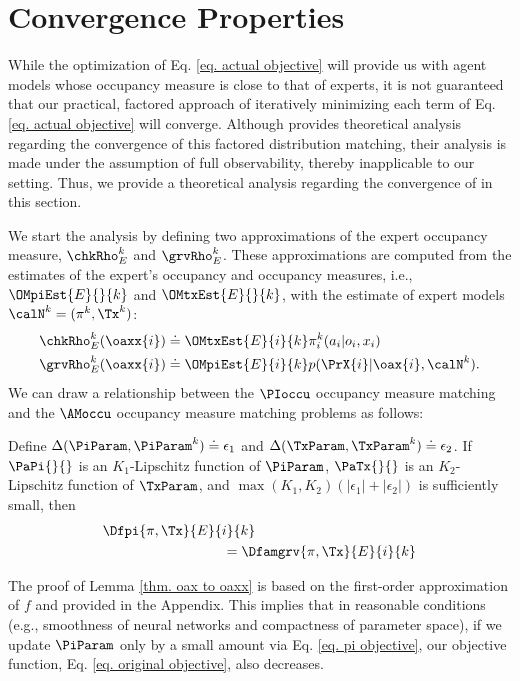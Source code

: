 \section{Convergence Properties}
\newcommand{\postPrX}[2]{p(\PrX{#1}|\oax{#1}, #2)}
\newcommand{\Dfpilemma}[1]{\Dfpi{\pi,\Tx}{E}{#1}{k}}
\newcommand{\Dfamlemma}[1]{\Dfamgrv{\pi,\Tx}{E}{#1}{k}}
While the optimization of Eq. \ref{eq. actual objective} will provide us with agent models whose occupancy measure is close to that of experts, it is not guaranteed that our practical, factored approach of iteratively minimizing each term of Eq. \ref{eq. actual objective} will converge. Although \idil provides theoretical analysis regarding the convergence of this factored distribution matching, their analysis is made under the assumption of full observability, thereby inapplicable to our setting. Thus, we provide a theoretical analysis regarding the convergence of \ouralg in this section.



We start the analysis by defining two approximations of the expert \AMoccu occupancy measure, $\chkRho_E^k$ and $\grvRho_E^k$. These approximations are computed from the estimates of the expert's \PIoccu occupancy and \TXoccu occupancy measures, i.e., $\OMpiEst{E}{}{k}$ and $\OMtxEst{E}{}{k}$, with the estimate of expert models $\calN^{k} = (\pi^{k}, \Tx^{k})$:
\begin{align*}
    \chkRho_E^k(\oaxx{i}) &\doteq \OMtxEst{E}{i}{k}\pi_i^k(a_i|o_i, x_i) \\
    \grvRho_E^k(\oaxx{i}) &\doteq \OMpiEst{E}{i}{k} \postPrX{i}{\calN^k}.
\end{align*}
We can draw a relationship between the $\PIoccu$ occupancy measure matching and the $\AMoccu$ occupancy measure matching problems as follows:
\begin{lemma}
\label{thm. oax to oaxx}
    Define $\Delta(\PiParam, \PiParam^k)\doteq\epsilon_1$ and $\Delta(\TxParam, \TxParam^k)\doteq\epsilon_2$. If $\PaPi{}{}$ is an $K_1$-Lipschitz function of $\PiParam$, $\PaTx{}{}$ is an $K_2$-Lipschitz function of $\TxParam$, and $\max(K_1, K_2)(|\epsilon_1| + |\epsilon_2|)$ is sufficiently small, then 
    \begin{align*}
        &\Dfpilemma{i} \\
        &\hspace{20ex}=\Dfamlemma{i}
    \end{align*}
\end{lemma}
The proof of Lemma \ref{thm. oax to oaxx} is based on the first-order approximation of $f$ and provided in the Appendix. This implies that in reasonable conditions (e.g., smoothness of neural networks and compactness of parameter space), if we update $\PiParam$ only by a small amount via Eq. \ref{eq. pi objective}, our objective function, Eq. \ref{eq. original objective}, also decreases.


